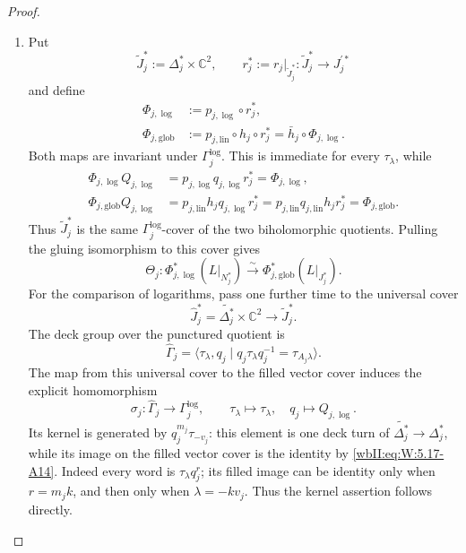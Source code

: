 \begin{proof}
\begin{enumerate}[label=\arabic*.,leftmargin=*]
\item Put
\[
 \widetilde J_j^*:=\Delta_j^*\times\mathbb C^2,
 \qquad
 r_j^*:=r_j|_{\widetilde J_j^*}:
 \widetilde J_j^*\longrightarrow J_j^{\prime *}
\]
and define
\[
\begin{aligned}
 \Phi_{j,\log}
  &:=p_{j,\log}\circ r_j^*,\\
 \Phi_{j,\mathrm{glob}}
  &:=p_{j,\mathrm{lin}}\circ h_j\circ r_j^*
   =\bar h_j\circ\Phi_{j,\log}.
\end{aligned}
\]
Both maps are invariant under \(\Gamma_j^{\log}\).  This is immediate for
every \(\tau_\lambda\), while
\[
\begin{aligned}
 \Phi_{j,\log}Q_{j,\log}
 &=p_{j,\log}q_{j,\log}r_j^*
  =\Phi_{j,\log},\\
 \Phi_{j,\mathrm{glob}}Q_{j,\log}
 &=p_{j,\mathrm{lin}}h_jq_{j,\log}r_j^*
  =p_{j,\mathrm{lin}}q_{j,\mathrm{lin}}h_jr_j^*
  =\Phi_{j,\mathrm{glob}}.
\end{aligned}
\]
Thus \(\widetilde J_j^*\) is the same \(\Gamma_j^{\log}\)-cover of the two
biholomorphic quotients.  Pulling the gluing isomorphism to this cover gives
\[
 \Theta_j:
 \Phi_{j,\log}^*(L|_{N_j^*})
 \xrightarrow{\ \sim\ }
 \Phi_{j,\mathrm{glob}}^*(L|_{J_j^*}).
\]
For the comparison of logarithms, pass one further time to the universal
cover
\[
 \widehat J_j^*=\widetilde{\Delta_j^*}\times\mathbb C^2
 \longrightarrow \widetilde J_j^*.
\]
The deck group over the punctured quotient is
\[
 \widehat\Gamma_j=
 \langle\tau_\lambda,q_j\mid
 q_j\tau_\lambda q_j^{-1}=\tau_{A_j\lambda}\rangle.
\]
The map from this universal cover to the filled vector cover induces the
explicit homomorphism
\[
 \sigma_j:\widehat\Gamma_j\longrightarrow\Gamma_j^{\log},
 \qquad \tau_\lambda\longmapsto\tau_\lambda,
 \quad q_j\longmapsto Q_{j,\log}.
\]
Its kernel is generated by
\(q_j^{m_j}\tau_{-v_j}\): this element is one deck turn of
\(\widetilde{\Delta_j^*}\to\Delta_j^*\), while its image on the
filled vector cover is the identity by \eqref{wbII:eq:W:5.17-A14}.
Indeed every word is \(\tau_\lambda q_j^r\); its filled image can be
identity only when \(r=m_jk\), and then only when
\(\lambda=-kv_j\).  Thus the kernel assertion follows directly.


\end{enumerate}
\end{proof}
